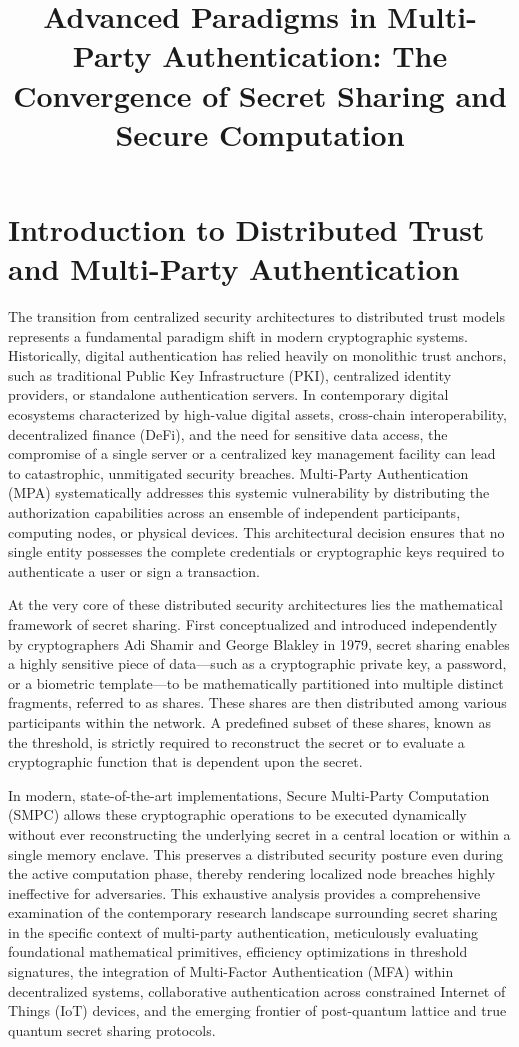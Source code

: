 \documentclass[11pt, a4paper]{article}
\title{Advanced Paradigms in Multi-Party Authentication: The Convergence of Secret Sharing and Secure Computation}
\author{}
\date{}
\begin{document}
\maketitle

\section*{Introduction to Distributed Trust and Multi-Party Authentication}
The transition from centralized security architectures to distributed trust models represents a fundamental paradigm shift in modern cryptographic systems. Historically, digital authentication has relied heavily on monolithic trust anchors, such as traditional Public Key Infrastructure (PKI), centralized identity providers, or standalone authentication servers. In contemporary digital ecosystems characterized by high-value digital assets, cross-chain interoperability, decentralized finance (DeFi), and the need for sensitive data access, the compromise of a single server or a centralized key management facility can lead to catastrophic, unmitigated security breaches. Multi-Party Authentication (MPA) systematically addresses this systemic vulnerability by distributing the authorization capabilities across an ensemble of independent participants, computing nodes, or physical devices. This architectural decision ensures that no single entity possesses the complete credentials or cryptographic keys required to authenticate a user or sign a transaction.

At the very core of these distributed security architectures lies the mathematical framework of secret sharing. First conceptualized and introduced independently by cryptographers Adi Shamir and George Blakley in 1979, secret sharing enables a highly sensitive piece of data—such as a cryptographic private key, a password, or a biometric template—to be mathematically partitioned into multiple distinct fragments, referred to as shares. These shares are then distributed among various participants within the network. A predefined subset of these shares, known as the threshold, is strictly required to reconstruct the secret or to evaluate a cryptographic function that is dependent upon the secret.

In modern, state-of-the-art implementations, Secure Multi-Party Computation (SMPC) allows these cryptographic operations to be executed dynamically without ever reconstructing the underlying secret in a central location or within a single memory enclave. This preserves a distributed security posture even during the active computation phase, thereby rendering localized node breaches highly ineffective for adversaries. This exhaustive analysis provides a comprehensive examination of the contemporary research landscape surrounding secret sharing in the specific context of multi-party authentication, meticulously evaluating foundational mathematical primitives, efficiency optimizations in threshold signatures, the integration of Multi-Factor Authentication (MFA) within decentralized systems, collaborative authentication across constrained Internet of Things (IoT) devices, and the emerging frontier of post-quantum lattice and true quantum secret sharing protocols.
\end{document}
